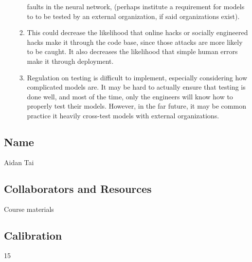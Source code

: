 \documentclass[submit]{harvardml}
\begin{document}
\begin{sol}{}
\begin{center}
\begin{enumerate}
\begin{enumerate}
          faults in the neural network, (perhaps institute a
          requirement for models to to be tested by an external 
          organization, if said organizations exist). 
          \item This could
          decrease the likelihood that online hacks or socially
          engineered hacks make it through the code base, since
          those attacks are more likely to be caught. It
          also decreases the likelihood that simple human errors
          make it through deployment. 
          \item Regulation on testing is difficult to implement,
          especially considering how complicated models are. It may
          be hard to actually ensure that testing is done well, and
          most of the time, only the engineers will know how to
          properly test their models. However, in the far future,
          it may be common practice it heavily cross-test models
          with external organizations.
        \end{enumerate}

      
    \end{enumerate}
  \end{center}
\end{sol}

\newpage

\subsection*{Name}
Aidan Tai

\subsection*{Collaborators and Resources}
Course materials

\subsection*{Calibration}
15
\end{document}
